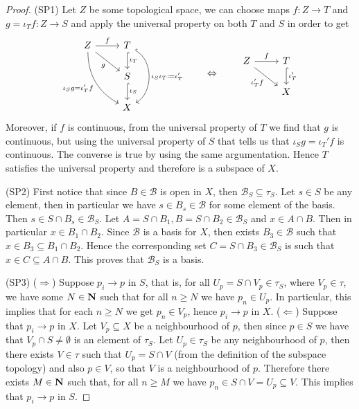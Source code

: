 \begin{proof}
(SP1) Let \(Z\) be some topological space, we can choose maps \(f: Z \to T\)
and \(g = \iota_T  f : Z \to S\) and apply the universal property on both
\(T\) and \(S\) in order to get
\[
  \begin{tikzcd}
    Z \ar[r,"f"]
    \ar[rd, swap, "g"]
    \ar[rdd, swap, bend right,
    "\iota_S  g = \iota_T'  f"]
      &T \ar[d, hook, "\iota_T"]
      \ar[dd, hook, bend left = 60, "\iota_S  \iota_T \coloneq \iota_T'"]\\
      &S \ar[d, hook, "\iota_S"] \\
      &X
  \end{tikzcd}
  \qquad \Leftrightarrow \qquad
  \begin{tikzcd}
    Z \ar[dr, swap, "\iota_T'  f"] \ar[r, "f"]
      &T \ar[d, hook, "\iota_T'"] \\
      &X
  \end{tikzcd}
\]
Moreover, if \(f\) is continuous, from the universal property of \(T\) we find
that \(g\) is continuous, but using the universal property of \(S\) that tells
us that \(\iota_S  g = \iota_T' f\) is continuous. The converse is
true by using the same argumentation. Hence \(T\) satisfies the universal
property and therefore is a subspace of \(X\).

(SP2) First notice that since \(B \in \mathcal B\) is open in \(X\), then
\(\mathcal B_S \subseteq \tau_S\). Let \(s \in S\) be any element, then in
particular we have \(s \in B_s \in \mathcal B\) for some element of the
basis. Then \(s \in S \cap B_s \in \mathcal B_S\). Let
\(A = S \cap B_1, B = S \cap B_2 \in \mathcal B_S\) and \(x \in A \cap B\). Then
in particular \(x \in B_1 \cap B_2\). Since \(\mathcal B\) is a basis for \(X\),
then exists \(B_3 \in \mathcal B\) such that
\(x \in B_3 \subseteq B_1 \cap B_2\). Hence the corresponding set
\(C = S \cap B_3 \in \mathcal B_S\) is such that \(x \in C \subseteq A \cap
B\). This proves that \(\mathcal B_S\) is a basis.

(SP3) (\(\Rightarrow\)) Suppose \(p_i \to p\) in \(S\), that is, for all
\(U_p = S \cap V_p \in \tau_S\), where \(V_p \in \tau\), we have
some \(N \in \mathbf{N}\) such that for all \(n \geq N\) we have \(p_n \in U_p\). In
particular, this implies that for each \(n \geq N\) we get \(p_n \in V_p\),
hence \(p_i \to p\) in \(X\).  (\(\Leftarrow\)) Suppose that \(p_i \to p\) in
\(X\). Let \(V_p \subseteq X\) be a neighbourhood of \(p\), then since
\(p \in S\) we have that \(V_p \cap S \neq \emptyset\) is an element of
\(\tau_S\). Let \(U_p \in \tau_S\) be any neighbourhood of \(p\),
then there exists \(V \in \tau\) such that \(U_p = S \cap V\) (from the
definition of the subspace topology) and also \(p \in V\), so that \(V\) is a
neighbourhood of \(p\).  Therefore there exists \(M \in \mathbf{N}\) such that, for all
\(n \geq M\) we have \(p_n \in S \cap V = U_p \subseteq V\). This implies that
\(p_i \to p\) in \(S\).


\end{proof}
